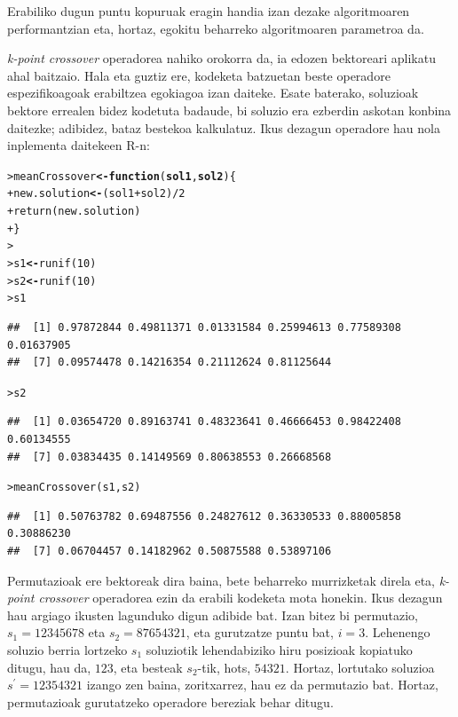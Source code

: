 \documentclass[eu]{ifirak}\usepackage[]{graphicx}\usepackage[]{color}
\makeatletter
\newcommand{\hlnum}[1]{\textcolor[rgb]{0.659,0.4,0.051}{#1}}%
\newcommand{\hlopt}[1]{\textcolor[rgb]{0,0,0}{#1}}%
\newcommand{\hlstd}[1]{\textcolor[rgb]{0,0,0}{#1}}%
\newcommand{\hlkwa}[1]{\textcolor[rgb]{0.133,0.224,0.659}{\textbf{#1}}}%
\newcommand{\hlkwb}[1]{\textcolor[rgb]{0.549,0.114,0.412}{\textbf{#1}}}%
\newcommand{\hlkwc}[1]{\textcolor[rgb]{0.659,0.573,0.133}{\textbf{#1}}}%
\newcommand{\hlkwd}[1]{\textcolor[rgb]{0.659,0.133,0.482}{#1}}%
\newenvironment{kframe}{%
 \def\at@end@of@kframe{}%
 \ifinner\ifhmode%
  \def\at@end@of@kframe{\end{minipage}}%
  \begin{minipage}{\columnwidth}%
 \fi\fi%
 \def\FrameCommand##1{\hskip\@totalleftmargin \hskip-\fboxsep
 \colorbox{shadecolor}{##1}\hskip-\fboxsep
     \hskip-\linewidth \hskip-\@totalleftmargin \hskip\columnwidth}%
 \MakeFramed {\advance\hsize-\width
   \@totalleftmargin\z@ \linewidth\hsize
   \@setminipage}}%
 {\par\unskip\endMakeFramed%
 \at@end@of@kframe}
\newenvironment{knitrout}{}{} %
\newcommand{\eng}[1]{\textit{#1}}
\makeatother
\begin{document}
Erabiliko dugun puntu kopuruak eragin handia izan dezake algoritmoaren performantzian eta, hortaz, egokitu beharreko algoritmoaren parametroa da. 

\eng{k-point crossover} operadorea nahiko orokorra da, ia edozen bektoreari aplikatu ahal baitzaio. Hala eta guztiz ere, kodeketa batzuetan beste operadore espezifikoagoak erabiltzea egokiagoa izan daiteke\cite{gwiazda2006}. Esate baterako, soluzioak bektore errealen bidez kodetuta badaude, bi soluzio era ezberdin askotan konbina daitezke; adibidez, bataz bestekoa kalkulatuz. Ikus dezagun operadore hau nola inplementa daitekeen R-n:

\begin{knitrout}
\color{fgcolor}\begin{kframe}
\begin{alltt}
\hlstd{> }\hlstd{meanCrossover} \hlkwb{<-} \hlkwa{function}\hlstd{(}\hlkwc{sol1}\hlstd{,} \hlkwc{sol2}\hlstd{) \{}
\hlstd{+ }  \hlstd{new.solution} \hlkwb{<-} \hlstd{(sol1} \hlopt{+} \hlstd{sol2)} \hlopt{/} \hlnum{2}
\hlstd{+ }  \hlkwd{return}\hlstd{(new.solution)}
\hlstd{+ }\hlstd{\}}
\hlstd{> }
\hlstd{> }\hlstd{s1} \hlkwb{<-} \hlkwd{runif}\hlstd{(}\hlnum{10}\hlstd{)}
\hlstd{> }\hlstd{s2} \hlkwb{<-} \hlkwd{runif}\hlstd{(}\hlnum{10}\hlstd{)}
\hlstd{> }\hlstd{s1}
\end{alltt}
\begin{verbatim}
##  [1] 0.97872844 0.49811371 0.01331584 0.25994613 0.77589308 0.01637905
##  [7] 0.09574478 0.14216354 0.21112624 0.81125644
\end{verbatim}
\begin{alltt}
\hlstd{> }\hlstd{s2}
\end{alltt}
\begin{verbatim}
##  [1] 0.03654720 0.89163741 0.48323641 0.46666453 0.98422408 0.60134555
##  [7] 0.03834435 0.14149569 0.80638553 0.26668568
\end{verbatim}
\begin{alltt}
\hlstd{> }\hlkwd{meanCrossover}\hlstd{(s1, s2)}
\end{alltt}
\begin{verbatim}
##  [1] 0.50763782 0.69487556 0.24827612 0.36330533 0.88005858 0.30886230
##  [7] 0.06704457 0.14182962 0.50875588 0.53897106
\end{verbatim}
\end{kframe}
\end{knitrout}

Permutazioak ere bektoreak dira baina, bete beharreko murrizketak direla eta, \eng{k-point crossover} operadorea ezin da erabili kodeketa mota honekin.  Ikus dezagun hau argiago ikusten lagunduko digun adibide bat. Izan bitez bi permutazio, $s_1 = 12345678$ eta $s_2=87654321$, eta gurutzatze puntu bat, $i=3$. Lehenengo soluzio berria lortzeko $s_1$ soluziotik lehendabiziko hiru posizioak kopiatuko ditugu, hau da, $123$, eta besteak $s_2$-tik, hots, $54321$. Hortaz, lortutako soluzioa $s^\prime = 12354321$ izango zen baina, zoritxarrez, hau ez da permutazio bat. Hortaz, permutazioak gurutatzeko operadore bereziak behar ditugu. 
\end{document}
